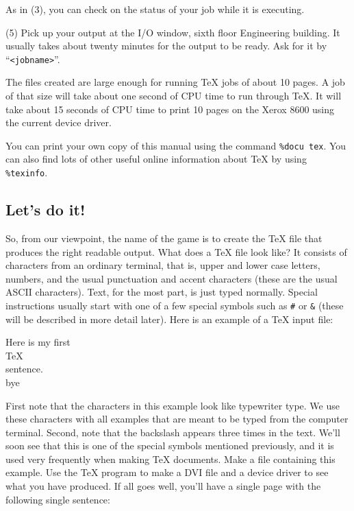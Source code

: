 As in (3), you can check on the status of your job while it is 
executing. 
\item{(5)} Pick up your output at the I/O window, sixth floor 
Engineering building.  It usually takes about twenty minutes for the 
output to be ready.  Ask for it by ``{\tt <jobname>}''. 
 
The files created are large enough for running \TeX{} jobs of about 
10 pages.  A job of that size will take about one second of CPU time 
to run through \TeX\null.  It will take about 15 seconds of CPU time to 
print 10 pages on the Xerox 8600 using the current device driver. 
 
You can print your own copy of this manual using the command 
{\tt \%docu tex}. You can also find lots of other useful 
online information about \TeX{} by using {\tt \%texinfo}. 
 
\subsection{Let's do it!} 
 
So, from our viewpoint, the name of the game is to create the \TeX{} 
file that produces the right readable output. What does 
a \TeX{} file look like? It consists of characters from an 
ordinary terminal, that is, upper and lower case letters, 
numbers, and the usual punctuation and accent characters (these 
are the usual ASCII characters). Text, for the most part, is just 
typed normally. Special instructions usually start with one of a 
few special symbols such as {\tt \#} or {\tt \&} (these will be 
described in more detail later). Here is an example of a \TeX{} 
input file: 
 
\beginuser 
Here is my first \\TeX\\ sentence. 
\\bye 
\enduser 
{} \toindex{ } 
 
 
First note that the characters in this example look like 
typewriter type. We use these characters with all examples that 
are meant to be typed from the computer terminal. Second, note 
that the backslash appears three times in the text. We'll soon 
see that this is one of the special symbols mentioned 
previously, and it is used very frequently when making \TeX{} 
documents. Make a file containing this example. Use the \TeX{} 
program to make a DVI file and a device driver to see what you 
have produced. If all goes well, you'll have a single page with 
the following single sentence: 
 
